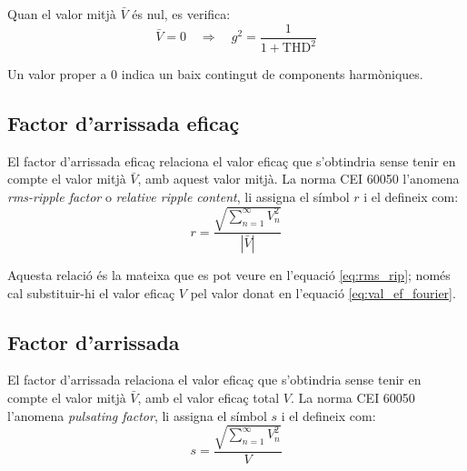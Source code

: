 Quan el valor mitjà $\bar{V}$ és nul, es verifica:
\begin{equation}
   \bar{V}=0 \quad \Rightarrow\quad g^2 = \frac{1}{1+\text{THD}^2}
\end{equation}

Un valor proper a 0 indica un baix contingut de components harmòniques.

\subsection{Factor d'arrissada eficaç}\label{sec:four_fac_arr_ef}

El factor d'arrissada eficaç relaciona el valor eficaç  que
s'obtindria sense tenir en compte el valor mitjà  $\bar{V}$, amb aquest
valor mitjà. La norma CEI 60050 l'anomena \textit{rms-ripple factor} o \textit{relative ripple content}, li assigna el símbol $r$ i el defineix com:
\begin{equation}
    r = \frac{\sqrt{\displaystyle\sum_{n=1}^\infty V^2_n}}{|\bar{V}|}
\end{equation}

Aquesta relació és la mateixa que es pot veure en l'equació  \eqref{eq:rms_rip}; només cal substituir-hi el valor eficaç $V$ pel valor donat en l'equació \eqref{eq:val_ef_fourier}.

\subsection{Factor d'arrissada}

El factor d'arrissada relaciona el valor eficaç  que
s'obtindria sense tenir en compte el valor mitjà  $\bar{V}$, amb el
valor eficaç total $V$. La norma CEI 60050 l'anomena \textit{pulsating factor}, li assigna el símbol $s$ i el defineix com:
\begin{equation}
    s = \frac{\sqrt{\displaystyle\sum_{n=1}^\infty V^2_n}}{V}
\end{equation}

